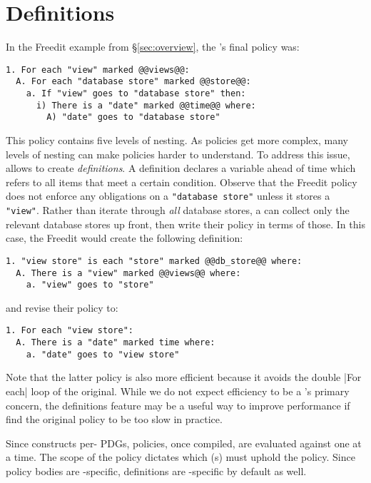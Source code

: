 \section{Definitions}
\label{sec:definitions}

In the Freedit example from \S\ref{sec:overview}, the \ce{}'s final policy was:
\begin{lstlisting}[language=CNL]
1. For each "view" marked @@views@@:
  A. For each "database store" marked @@store@@:
    a. If "view" goes to "database store" then:
      i) There is a "date" marked @@time@@ where:
        A) "date" goes to "database store"
\end{lstlisting}
This policy contains five levels of nesting.
%
As policies get more complex, many levels of nesting can make policies harder to understand.
%
To address this issue, \syslang{} allows \ces{} to create \emph{definitions}.
%
A definition declares a variable ahead of time which refers to all items that meet a certain condition.
%
Observe that the Freedit policy does not enforce any obligations on a \break{}
\lstinline[language=CNL]|"database store"| unless it stores a \lstinline[language=CNL]|"view"|.
%
Rather than iterate through \emph{all} database stores, 
a \writer{} can collect only the relevant database stores up front,
then write their policy in terms of those.
%
In this case, the Freedit \ce{} would create the following definition:
\begin{lstlisting}[language=CNL]
1. "view store" is each "store" marked @@db_store@@ where:
  A. There is a "view" marked @@views@@ where:
    a. "view" goes to "store"
\end{lstlisting}
and revise their policy to:
\begin{lstlisting}[language=CNL]
1. For each "view store":
  A. There is a "date" marked time where:
    a. "date" goes to "view store" 
\end{lstlisting}
%
Note that the latter policy is also more efficient because it avoids the double |For each| loop of the original.
%
While we do not expect efficiency to be a \ce's primary concern,
the definitions feature may be a useful way to improve performance
if \devs{} find the original policy to be too slow in practice.

Since \sys{} constructs per-\controller{} PDGs,
\syslang{} policies, once compiled, are evaluated against one \controller{} at a time.
%
The scope of the policy dictates which \controller{}(s) must uphold the policy.
%
Since policy bodies are \controller{}-specific,
definitions are \controller{}-specific by default as well.

